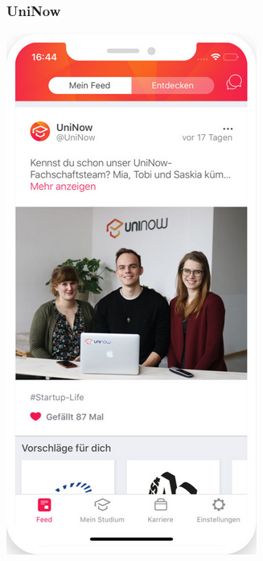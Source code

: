 \documentclass[10pt,a4paper]{beamer}
\begin{document}
\begin{frame}
	\frametitle{UniNow}
	\begin{center}
	\includegraphics[height=0.7\textheight]{uninow1.png}
	\hspace{1cm}

\end{center}
\end{frame}
\end{document}
